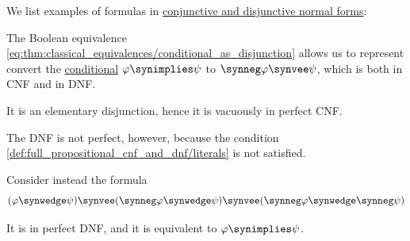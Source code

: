 \begin{example}\label{ex:def:propositional_cnf_and_dnf}
  We list examples of formulas in \hyperref[def:propositional_cnf_and_dnf]{conjunctive and disjunctive normal forms}:
  \begin{thmenum}
     The Boolean equivalence \eqref{eq:thm:classical_equivalences/conditional_as_disjunction} allows us to represent convert the \hyperref[def:propositional_alphabet/connectives/conditional]{conditional} \( \varphi \synimplies \psi \) to \( \synneg \varphi \synvee \psi \), which is both in CNF and in DNF.

    It is an elementary disjunction, hence it is vacuously in perfect CNF.

    The DNF is not perfect, however, because the condition \cref{def:full_propositional_cnf_and_dnf/literals} is not satisfied.

     Consider instead the formula
    \begin{equation*}
      (\varphi \synwedge \psi) \synvee (\synneg \varphi \synwedge \psi) \synvee (\synneg \varphi \synwedge \synneg \psi)
    \end{equation*}

    It is in perfect DNF, and it is equivalent to \( \varphi \synimplies \psi \).
  \end{thmenum}
\end{example}


